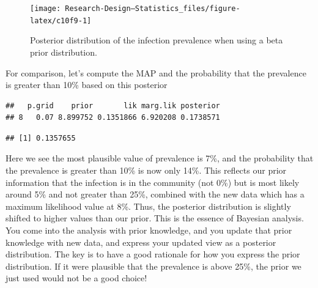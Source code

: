\documentclass[
]{book}
\newenvironment{Shaded}{\begin{snugshade}}{\end{snugshade}}
\newcommand{\CommentTok}[1]{\textcolor[rgb]{0.56,0.35,0.01}{\textit{#1}}}
\newcommand{\FloatTok}[1]{\textcolor[rgb]{0.00,0.00,0.81}{#1}}
\newcommand{\FunctionTok}[1]{\textcolor[rgb]{0.13,0.29,0.53}{\textbf{#1}}}
\newcommand{\NormalTok}[1]{#1}
\newcommand{\SpecialCharTok}[1]{\textcolor[rgb]{0.81,0.36,0.00}{\textbf{#1}}}
\begin{document}
\begin{figure}

{\centering \texttt{[image: Research-Design---Statistics\_files/figure-latex/c10f9-1]} 

}

\caption{Posterior distribution of the infection prevalence when using a beta prior distribution.}\label{fig:c10f9}
\end{figure}

For comparison, let's compute the MAP and the probability that the prevalence is greater than 10\% based on this posterior

\begin{Shaded}
\end{Shaded}

\begin{verbatim}
##   p.grid    prior       lik marg.lik posterior
## 8   0.07 8.899752 0.1351866 6.920208 0.1738571
\end{verbatim}

\begin{Shaded}
\end{Shaded}

\begin{verbatim}
## [1] 0.1357655
\end{verbatim}

Here we see the most plausible value of prevalence is 7\%, and the probability that the prevalence is greater than 10\% is now only 14\%. This reflects our prior information that the infection is in the community (not 0\%) but is most likely around 5\% and not greater than 25\%, combined with the new data which has a maximum likelihood value at 8\%. Thus, the posterior distribution is slightly shifted to higher values than our prior. This is the essence of Bayesian analysis. You come into the analysis with prior knowledge, and you update that prior knowledge with new data, and express your updated view as a posterior distribution. The key is to have a good rationale for how you express the prior distribution. If it were plausible that the prevalence is above 25\%, the prior we just used would not be a good choice!
\end{document}
